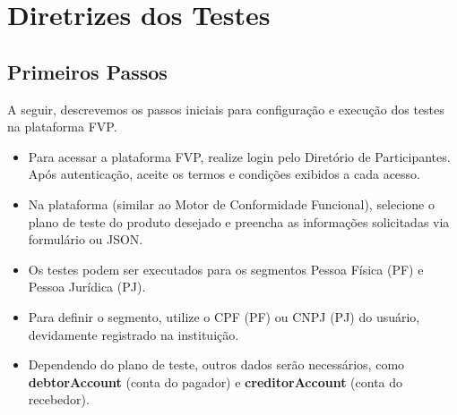 ﻿\chapter{Diretrizes dos Testes}

\section{Primeiros Passos}

A seguir, descrevemos os passos iniciais para configuração e execução dos testes na plataforma FVP.

\begin{itemize}
    \item Para acessar a plataforma FVP, realize login pelo Diretório de Participantes. Após autenticação, aceite os termos e condições exibidos a cada acesso.
    \item Na plataforma (similar ao Motor de Conformidade Funcional), selecione o plano de teste do produto desejado e preencha as informações solicitadas via formulário ou JSON.
    \item Os testes podem ser executados para os segmentos Pessoa Física (PF) e Pessoa Jurídica (PJ).
    \item Para definir o segmento, utilize o CPF (PF) ou CNPJ (PJ) do usuário, devidamente registrado na instituição.
    \item Dependendo do plano de teste, outros dados serão necessários, como \textbf{debtorAccount} (conta do pagador) e \textbf{creditorAccount} (conta do recebedor).
\end{itemize}


